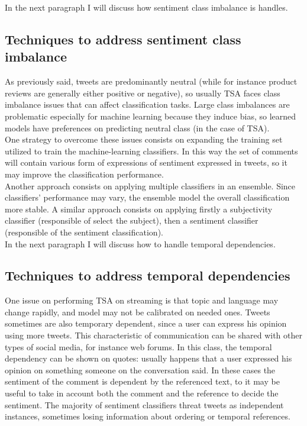 In the next paragraph I will discuss how sentiment class imbalance is handles.\\


\subsection{Techniques to address sentiment class imbalance}
As previously said, tweets are predominantly neutral (while for instance product reviews are generally either positive or negative), so usually TSA faces class imbalance issues that can affect classification tasks. Large class imbalances are problematic especially for machine learning because they induce bias, so learned models have preferences on predicting neutral class (in the case of TSA).\\
One strategy to overcome these issues consists on expanding the training set utilized to train the machine-learning classifiers. In this way the set of comments will contain various form of expressions of sentiment expressed in tweets, so it may improve the classification performance.\\
Another approach consists on applying multiple classifiers in an ensemble. Since classifiers' performance may vary, the ensemble model the overall classification more stable. A similar approach consists on applying firstly a subjectivity classifier (responsible of select the subject), then a sentiment classifier (responsible of the sentiment classification).\\

In the next paragraph I will discuss how to handle temporal dependencies.


\subsection{Techniques to address temporal dependencies}
One issue on performing TSA on streaming is that topic and language may change rapidly, and model may not be calibrated on needed ones. Tweets sometimes are also temporary dependent, since a user can express his opinion using more tweets. This characteristic of communication can be shared with other types of social media, for instance web forums. In this class, the temporal dependency can be shown on quotes: usually happens that a user expressed his opinion on something someone on the conversation said. In these cases the sentiment of the comment is dependent by the referenced text, to it may be useful to take in account both the comment and the reference to decide the sentiment. The majority of sentiment classifiers threat tweets as independent instances, sometimes losing information about ordering or temporal references.




